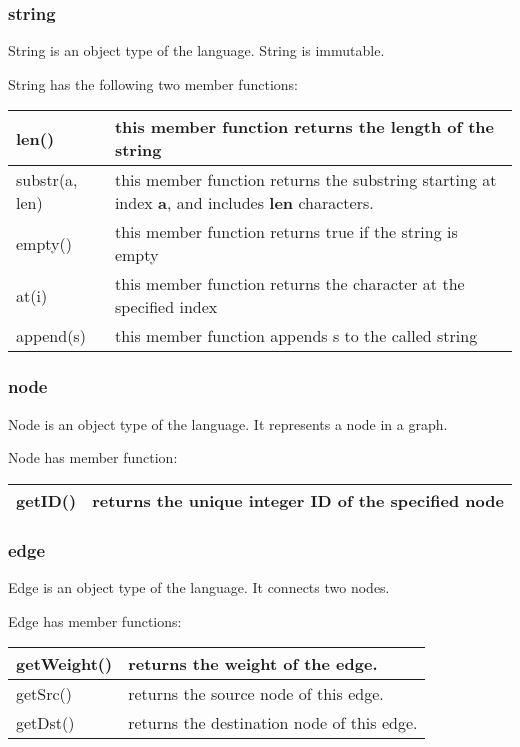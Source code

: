 \documentclass[a4paper,12pt]{article}
\begin{document}
\subsubsection{string}
String is an object type of the language. String is immutable.

String has the following two member functions:
\begin{center}
\begin{tabular}{| l | p{10cm} |}
\hline
	len()		& this member function returns the length of the string \\ \hline
	substr(a, len)  & this member function returns the substring starting at index \textbf{a}, and includes \textbf{len} characters. \\ \hline
	empty()	& this member function returns true if the string is empty \\ \hline
	at(i)		& this member function returns the character at the specified index \\ \hline
	append(s)  & this member function appends s to the called string \\ \hline
\end{tabular}
\end{center}

\subsubsection{node}

	Node is an object type of the language. It represents a node in a graph.
	
	Node has member function:
\begin{center}
\begin{tabular}{| l | p{10cm} |}
\hline
getID()	&	returns the unique integer ID of the specified node \\ \hline
\end{tabular}
\end{center}

\subsubsection{edge}

	Edge is an object type of the language. It connects two nodes.
	
	Edge has member functions:
\begin{center}
\begin{tabular}{| l | p{10cm} |}
\hline
		getWeight()	&	returns the weight of the edge. \\ \hline
		getSrc()  	&      returns the source node of this edge. \\ \hline
		getDst()	&	returns the destination node of this edge. \\ \hline
		
\end{tabular}
\end{center}
		
\end{document}
